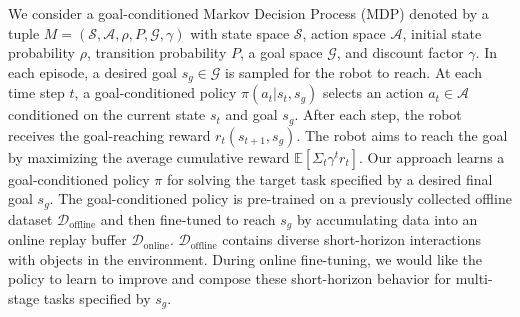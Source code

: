 We consider a goal-conditioned Markov Decision Process (MDP) denoted by a tuple $M = (\mathcal{S},\mathcal{A}, \rho, P, \mathcal{G}, \gamma)$ with state space $\mathcal{S}$, action space $\mathcal{A}$, initial state probability $\rho$, transition probability $P$, a goal space $\mathcal{G}$, and discount factor $\gamma$. In each episode, a desired goal $s_g \in \mathcal{G}$ is sampled for the robot to reach. At each time step $t$, a goal-conditioned policy $\pi(a_t | s_t, s_g)$ selects an action $a_t \in \mathcal{A}$ conditioned on the current state $s_t$ and goal $s_g$. After each step, the robot receives the goal-reaching reward $r_t(s_{t+1}, s_g)$.
The robot aims to reach the goal by maximizing the average cumulative reward $\mathbb{E}[\Sigma_t \gamma^t r_t]$.
Our approach learns a goal-conditioned policy $\pi$ for solving the target task specified by a desired final goal $s_g$. The goal-conditioned policy is pre-trained on a previously collected offline dataset $\mathcal{D}_\text{offline}$ and then fine-tuned to reach $s_g$ by accumulating data into an online replay buffer $\mathcal{D}_\text{online}$. $\mathcal{D}_\text{offline}$ contains diverse short-horizon interactions with objects in the environment. During online fine-tuning, we would like the policy to learn to improve and compose these short-horizon behavior for multi-stage tasks specified by $s_g$. 


